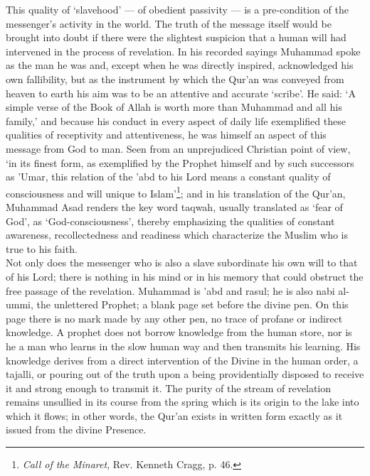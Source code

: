\documentclass[10pt, twoside]{book}
\begin{document}
This quality of `slavehood' --- of obedient passivity --- is a pre-condition of the messenger's activity 
in the world. The truth of the message itself would be brought into doubt if there were the slightest 
suspicion that a human will had intervened in the process of revelation. In his recorded sayings 
Muhammad spoke as the man he was and, except when he was directly inspired, acknowledged his own 
fallibility, but as the instrument by which the Qur'an was conveyed from heaven to earth his aim was 
to be an attentive and accurate `scribe'. He said: `A simple verse of the Book of Allah is worth more 
than Muhammad and all his family,' and because his conduct in every aspect of daily life exemplified 
these qualities of receptivity and attentiveness, he was himself an aspect of this message from God 
to man. Seen from an unprejudiced Christian point of view, `in its finest form, as exemplified by the 
Prophet himself and by such successors as 'Umar, this relation of the 'abd to his Lord means a 
constant quality of consciousness and will unique to Islam'\footnote{\emph{Call of the Minaret}, Rev. Kenneth Cragg, p. 46.}; and in his translation of the Qur'an, Muhammad Asad renders the key word taqwah, usually translated as `fear of God', as `God\hyp{}consciousness', thereby emphasizing the qualities of constant awareness, recollectedness and readiness which characterize the Muslim who is true to his faith. \\

Not only does the messenger who is also a slave subordinate his own will to that of his Lord; there 
is nothing in his mind or in his memory that could obstruct the free passage of the revelation. 
Muhammad is 'abd and rasul; he is also nabi al\hyp{}ummi, the unlettered Prophet; a blank page set before 
the divine pen. On this page there is no mark made by any other pen, no trace of profane or indirect 
knowledge. A prophet does not borrow knowledge from the human store, nor is he a man who learns in 
the slow human way and then transmits his learning. His knowledge derives from a direct intervention 
of the Divine in the human order, a tajalli, or pouring out of the truth upon a being providentially 
disposed to receive it and strong enough to transmit it. The purity of the stream of revelation 
remains unsullied in its course from the spring which is its origin to the lake into which it flows; 
in other words, the Qur'an exists in written form exactly as it issued from the divine Presence. \\
\end{document}
